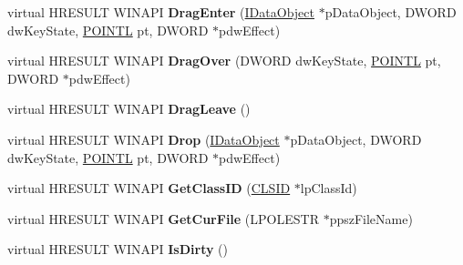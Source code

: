 \begin{DoxyCompactItemize}
\item 
\mbox{\label{class_c_exe_drop_handler_a6c60b690120038c4e2fd04ef28e6e81b}} 
virtual H\+R\+E\+S\+U\+LT W\+I\+N\+A\+PI {\bfseries Drag\+Enter} (\hyperlink{interface_i_data_object}{I\+Data\+Object} $\ast$p\+Data\+Object, D\+W\+O\+RD dw\+Key\+State, \hyperlink{struct___p_o_i_n_t_l}{P\+O\+I\+N\+TL} pt, D\+W\+O\+RD $\ast$pdw\+Effect)
\item 
\mbox{\label{class_c_exe_drop_handler_a9330b9ed985bd6078a81b0116e9a165e}} 
virtual H\+R\+E\+S\+U\+LT W\+I\+N\+A\+PI {\bfseries Drag\+Over} (D\+W\+O\+RD dw\+Key\+State, \hyperlink{struct___p_o_i_n_t_l}{P\+O\+I\+N\+TL} pt, D\+W\+O\+RD $\ast$pdw\+Effect)
\item 
\mbox{\label{class_c_exe_drop_handler_a0481679aab68f3f7c2f700f015969573}} 
virtual H\+R\+E\+S\+U\+LT W\+I\+N\+A\+PI {\bfseries Drag\+Leave} ()
\item 
\mbox{\label{class_c_exe_drop_handler_a248b23b198f57cc5721654bbf34ecc8d}} 
virtual H\+R\+E\+S\+U\+LT W\+I\+N\+A\+PI {\bfseries Drop} (\hyperlink{interface_i_data_object}{I\+Data\+Object} $\ast$p\+Data\+Object, D\+W\+O\+RD dw\+Key\+State, \hyperlink{struct___p_o_i_n_t_l}{P\+O\+I\+N\+TL} pt, D\+W\+O\+RD $\ast$pdw\+Effect)
\item 
\mbox{\label{class_c_exe_drop_handler_a7168368747f6037c97b18a6560f052c0}} 
virtual H\+R\+E\+S\+U\+LT W\+I\+N\+A\+PI {\bfseries Get\+Class\+ID} (\hyperlink{struct___i_i_d}{C\+L\+S\+ID} $\ast$lp\+Class\+Id)
\item 
\mbox{\label{class_c_exe_drop_handler_aef3ce8417c2692b03c29819b7f3c54b1}} 
virtual H\+R\+E\+S\+U\+LT W\+I\+N\+A\+PI {\bfseries Get\+Cur\+File} (L\+P\+O\+L\+E\+S\+TR $\ast$ppsz\+File\+Name)
\item 
\mbox{\label{class_c_exe_drop_handler_a1fc1d1a746ab31e7d0aa18a507ae5994}} 
virtual H\+R\+E\+S\+U\+LT W\+I\+N\+A\+PI {\bfseries Is\+Dirty} ()
\item 
\mbox{\label{class_c_exe_drop_handler_a99d0f016e776eb33ea884c39d2fba1e9}} 

\end{DoxyCompactItemize}
